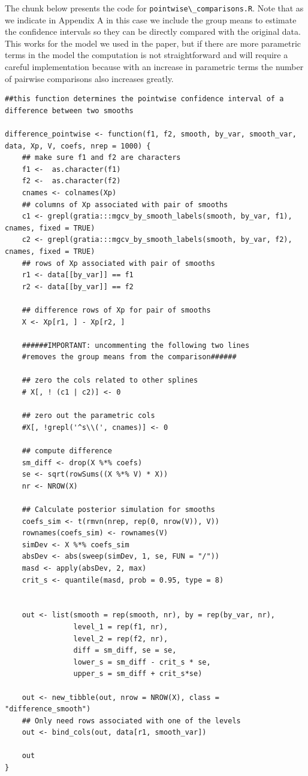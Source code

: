 \documentclass[
]{article}
\newcommand{\passthrough}[1]{#1}
\begin{document}
The chunk below presents the code for \passthrough{\lstinline!pointwise\_comparisons.R!}. Note that as we indicate in Appendix A in this case we include the group means to estimate the confidence intervals so they can be directly compared with the original data. This works for the model we used in the paper, but if there are more parametric terms in the model the computation is not straightforward and will require a careful implementation because with an increase in parametric terms the number of pairwise comparisons also increases greatly.

\begin{lstlisting}
##this function determines the pointwise confidence interval of a difference between two smooths

difference_pointwise <- function(f1, f2, smooth, by_var, smooth_var, data, Xp, V, coefs, nrep = 1000) {
    ## make sure f1 and f2 are characters
    f1 <-  as.character(f1)
    f2 <-  as.character(f2)
    cnames <- colnames(Xp)
    ## columns of Xp associated with pair of smooths
    c1 <- grepl(gratia:::mgcv_by_smooth_labels(smooth, by_var, f1), cnames, fixed = TRUE)
    c2 <- grepl(gratia:::mgcv_by_smooth_labels(smooth, by_var, f2), cnames, fixed = TRUE)
    ## rows of Xp associated with pair of smooths
    r1 <- data[[by_var]] == f1
    r2 <- data[[by_var]] == f2

    ## difference rows of Xp for pair of smooths
    X <- Xp[r1, ] - Xp[r2, ]

    ######IMPORTANT: uncommenting the following two lines
    #removes the group means from the comparison######

    ## zero the cols related to other splines
    # X[, ! (c1 | c2)] <- 0

    ## zero out the parametric cols
    #X[, !grepl('^s\\(', cnames)] <- 0

    ## compute difference
    sm_diff <- drop(X %*% coefs)
    se <- sqrt(rowSums((X %*% V) * X))
    nr <- NROW(X)

    ## Calculate posterior simulation for smooths
    coefs_sim <- t(rmvn(nrep, rep(0, nrow(V)), V))
    rownames(coefs_sim) <- rownames(V)
    simDev <- X %*% coefs_sim
    absDev <- abs(sweep(simDev, 1, se, FUN = "/"))
    masd <- apply(absDev, 2, max)
    crit_s <- quantile(masd, prob = 0.95, type = 8)


    out <- list(smooth = rep(smooth, nr), by = rep(by_var, nr),
                level_1 = rep(f1, nr),
                level_2 = rep(f2, nr),
                diff = sm_diff, se = se,
                lower_s = sm_diff - crit_s * se,
                upper_s = sm_diff + crit_s*se)

    out <- new_tibble(out, nrow = NROW(X), class = "difference_smooth")
    ## Only need rows associated with one of the levels
    out <- bind_cols(out, data[r1, smooth_var])

    out
}
\end{lstlisting}
\end{document}
